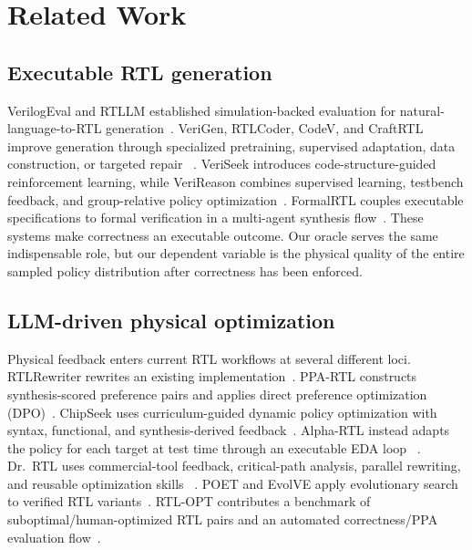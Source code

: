 \section{Related Work}
\label{sec:related}

\subsection{Executable RTL generation}

VerilogEval and RTLLM established simulation-backed evaluation for
natural-language-to-RTL generation~\cite{liu2023verilogeval,lu2024rtllm}.
VeriGen, RTLCoder, CodeV, and CraftRTL improve generation through specialized
pretraining, supervised adaptation, data construction, or targeted repair
~\cite{thakur2024verigen,liu2024rtlcoder,zhao2024codev,liu2024craftrtl}.
VeriSeek introduces code-structure-guided reinforcement learning, while
VeriReason combines supervised learning, testbench feedback, and group-relative
policy optimization~\cite{wang2024veriseek,wang2025verireason}.  FormalRTL
couples executable specifications to formal verification in a multi-agent
synthesis flow~\cite{formalrtl2026}.  These systems make correctness an
executable outcome.  Our oracle serves the same indispensable role, but our
dependent variable is the physical quality of the entire sampled policy
distribution after correctness has been enforced.

\subsection{LLM-driven physical optimization}

Physical feedback enters current RTL workflows at several different loci.
RTLRewriter rewrites an existing implementation~\cite{yao2024rtlrewriter}.
PPA-RTL constructs synthesis-scored preference pairs and applies direct
preference optimization (DPO)~\cite{ppartl2025}.  ChipSeek uses curriculum-guided
dynamic policy optimization with syntax, functional, and synthesis-derived
feedback~\cite{chipseek2025}.  Alpha-RTL instead adapts the
policy for each target at test time through an executable EDA loop
~\cite{zhou2026alphartl}.  Dr.~RTL uses commercial-tool feedback, critical-path
analysis, parallel rewriting, and reusable optimization skills
~\cite{drrtl2026}.  POET and EvolVE apply evolutionary search to verified RTL
variants~\cite{poet2026,evolve2026}.  RTL-OPT contributes a benchmark of
suboptimal/human-optimized RTL pairs and an automated correctness/PPA
evaluation flow~\cite{lu2026rtlopt}.

